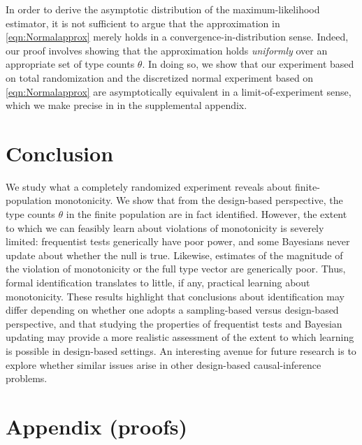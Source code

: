 \documentclass[12pt,reqno]{amsart}
\theoremstyle{theorem}
\theoremstyle{definition}
\newcommand{\0}{\mathbf{0}}
\newcommand{\1}{\mathbf{1}}
\begin{document}
In order to derive the asymptotic distribution of the maximum-likelihood estimator, it is
not sufficient to argue that the approximation in \eqref{eqn:Normalapprox} merely holds in
a convergence-in-distribution sense.
Indeed, our proof involves showing that the approximation holds \emph{uniformly} over an
appropriate set of type counts $\theta$. In doing so, we show that our experiment based on
total randomization and the discretized normal experiment based on 
\eqref{eqn:Normalapprox} are asymptotically equivalent in a limit-of-experiment sense,
which we make precise in  in the supplemental appendix.















\section{Conclusion}

We study what a completely randomized experiment reveals about finite-population monotonicity. We show that from the design-based perspective, the type counts $\theta$ in the finite population are in fact identified. However, the extent to which we can feasibly learn about violations of monotonicity is severely limited: frequentist tests generically have poor power, and some Bayesians never update about whether the null is true. Likewise, estimates of the magnitude of the violation of monotonicity or the full type vector are generically poor. Thus, formal identification translates to little, if any, practical learning about monotonicity. These results highlight that conclusions about identification may differ depending on whether one adopts a sampling-based versus design-based perspective, and that studying the properties of frequentist tests and Bayesian updating may provide a more realistic assessment of the extent to which learning is possible in design-based settings. An interesting avenue for future research is to explore whether similar issues arise in other design-based causal-inference problems. 

\newpage




\newpage

\appendix
\renewcommand{\sectionname}{}
\section{Appendix (proofs)}
\end{document}

